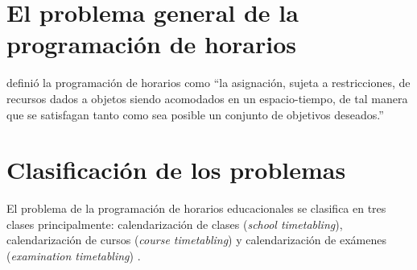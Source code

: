 \documentclass[draft,12pt,headsepline,footsepline,paper=letter]{scrreprt}
\begin{document}

\section{El problema general de la programación de horarios}
\label{sec:problema_general_programacion_horarios}

\citet[p.~53]{wren95scheduling-timetabling} definió la programación de horarios como “la asignación, sujeta a restricciones, de recursos dados a objetos siendo acomodados en un espacio-tiempo, de tal manera que se satisfagan tanto como sea posible un conjunto de objetivos deseados.”

\section{Clasificación de los problemas}
\label{sec:clasificacion_problemas}

El problema de la programación de horarios educacionales se clasifica en tres clases principalmente:
calendarización de clases (\textit{school timetabling}),
calendarización de cursos (\textit{course timetabling}) y
calendarización de exámenes (\textit{examination timetabling}) \citep[p.~88]{schaerf99a-survey-of-automated}.
\end{document}
